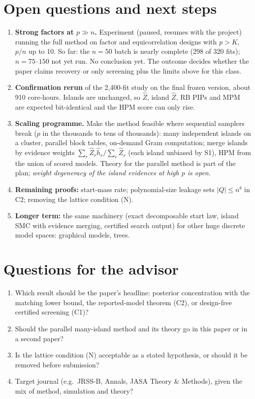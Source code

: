 \documentclass[10pt]{article}
\begin{document}
\section{Open questions and next steps}
\begin{enumerate}
\item \textbf{Strong factors at $p\gg n$.} Experiment (paused, resumes with the project) running the full method on factor and equicorrelation designs with $p>K$, $p/n$ up to 10. So far: the $n=50$ batch is nearly complete (298 of 320 fits); $n=75$--$150$ not yet run. No conclusion yet. The outcome decides whether the paper claims recovery or only screening plus the limits above for this class.
\item \textbf{Confirmation rerun} of the 2,400-fit study on the final frozen version, about 910 core-hours. Islands are unchanged, so $\hat Z$, island $\hat Z$, RB PIPs and MPM are expected bit-identical and the HPM score can only rise.
\item \textbf{Scaling programme.} Make the method feasible where sequential samplers break ($p$ in the thousands to tens of thousands): many independent islands on a cluster, parallel block tables, on-demand Gram computation; merge islands by evidence weights $\sum_r\hat Z_r\hat h_r/\sum_r\hat Z_r$ (each island unbiased by S1), HPM from the union of scored models. Theory for the parallel method is part of the plan; \emph{weight degeneracy of the island evidences at high $p$ is open}.
\item \textbf{Remaining proofs:} start-mass rate; polynomial-size leakage sets $|Q|\le n^b$ in C2; removing the lattice condition (N).
\item \textbf{Longer term:} the same machinery (exact decomposable start law, island SMC with evidence merging, certified search output) for other huge discrete model spaces: graphical models, trees.
\end{enumerate}

\section{Questions for the advisor}
\begin{enumerate}
\item Which result should be the paper's headline: posterior concentration with the matching lower bound, the reported-model theorem (C2), or design-free certified screening (C1)?
\item Should the parallel many-island method and its theory go in this paper or in a second paper?
\item Is the lattice condition (N) acceptable as a stated hypothesis, or should it be removed before submission?
\item Target journal (e.g.\ JRSS-B, Annals, JASA Theory \& Methods), given the mix of method, simulation and theory?
\end{enumerate}
\end{document}
